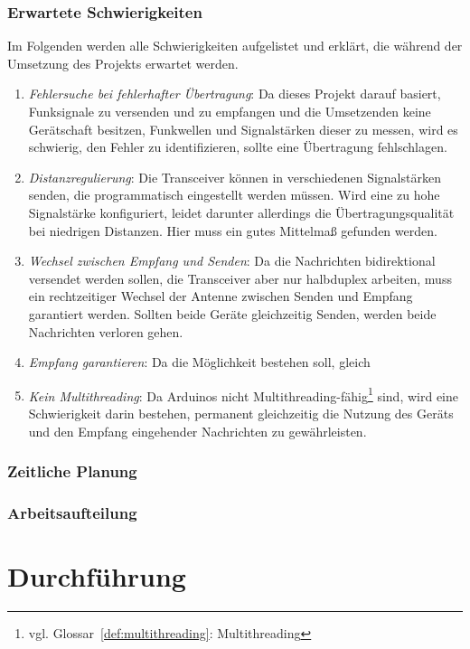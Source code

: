 \documentclass[a4paper, 11pt]{scrartcl}
\begin{document}
\subsubsection{Erwartete Schwierigkeiten}
Im Folgenden werden alle Schwierigkeiten aufgelistet und erklärt, die während der Umsetzung des Projekts erwartet werden.
\begin{enumerate}
    \item \textit{Fehlersuche bei fehlerhafter Übertragung}: Da dieses Projekt darauf basiert, Funksignale zu versenden und zu empfangen und die Umsetzenden keine Gerätschaft
            besitzen, Funkwellen und Signalstärken dieser zu messen, wird es schwierig, den Fehler zu identifizieren, sollte eine Übertragung fehlschlagen.
    \item \textit{Distanzregulierung}: Die Transceiver können in verschiedenen Signalstärken senden, die programmatisch eingestellt werden müssen.
            Wird eine zu hohe Signalstärke konfiguriert, leidet darunter allerdings die Übertragungsqualität bei niedrigen Distanzen. Hier muss ein gutes Mittelmaß
            gefunden werden.
    \item \textit{Wechsel zwischen Empfang und Senden}: Da die Nachrichten bidirektional versendet werden sollen, die Transceiver aber nur halbduplex arbeiten,
            muss ein rechtzeitiger Wechsel der Antenne zwischen Senden und Empfang garantiert werden. Sollten beide Geräte gleichzeitig Senden, werden beide Nachrichten
            verloren gehen.
    \item \textit{Empfang garantieren}: Da die Möglichkeit bestehen soll, gleich 
    \item \textit{Kein Multithreading}: Da Arduinos nicht Multithreading-fähig\footnote{vgl. Glossar~\ref{def:multithreading}: Multithreading} sind, wird eine Schwierigkeit
            darin bestehen, permanent gleichzeitig die Nutzung des Geräts und den Empfang eingehender Nachrichten zu gewährleisten.
\end{enumerate}

\subsubsection{Zeitliche Planung}

\subsubsection{Arbeitsaufteilung}

\section{Durchführung}
\end{document}
